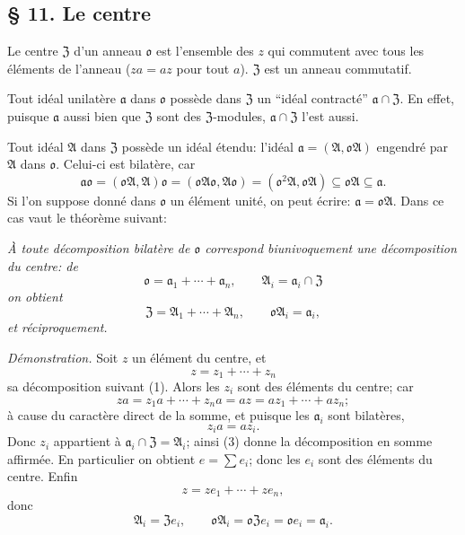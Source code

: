
\providecommand{\mo}{\mathfrak{o}}
\providecommand{\ma}{\mathfrak{a}}
\providecommand{\mA}{\mathfrak{A}}
\providecommand{\mZ}{\mathfrak{Z}}

\subsection*{\S{} 11. Le centre}

Le centre $\mZ$ d'un anneau $\mo$ est l'ensemble des $z$ qui commutent avec tous les éléments de l'anneau ($za=az$ pour tout $a$). $\mZ$ est un anneau commutatif.

Tout idéal unilatère $\ma$ dans $\mo$ possède dans $\mZ$ un ``idéal contracté'' $\ma\cap\mZ$. En effet, puisque $\ma$ aussi bien que $\mZ$ sont des $\mZ$-modules, $\ma\cap\mZ$ l'est aussi.

Tout idéal $\mA$ dans $\mZ$ possède un idéal étendu: l'idéal $\ma=(\mA,\mo\mA)$ engendré par $\mA$ dans $\mo$. Celui-ci est bilatère, car
\[
        \ma\mo=(\mo\mA,\mA)\mo=(\mo\mA\mo,\mA\mo)
        = (\mo^2\mA,\mo\mA)\subseteq \mo\mA\subseteq\ma.
\]
Si l'on suppose donné dans $\mo$ un élément unité, on peut écrire: $\ma=\mo\mA$. Dans ce cas vaut le théorème suivant:

\emph{À toute décomposition bilatère de $\mo$ correspond biunivoquement une décomposition du centre: de}
\begin{equation}
        \mo=\ma_1+\cdots+\ma_n,
        \qquad \mA_i=\ma_i\cap\mZ                         \tag{1}
\end{equation}
\emph{on obtient}
\begin{equation}
        \mZ=\mA_1+\cdots+\mA_n,
        \qquad \mo\mA_i=\ma_i,                              \tag{2}
\end{equation}
\emph{et réciproquement.}

\emph{Démonstration.} Soit $z$ un élément du centre, et
\begin{equation}
        z=z_1+\cdots+z_n                                    \tag{3}
\end{equation}
sa décomposition suivant (1). Alors les $z_i$ sont des éléments du centre; car
\[
        za=z_1a+\cdots+z_na=az=az_1+\cdots+az_n;
\]
à cause du caractère direct de la somme, et puisque les $\ma_i$ sont bilatères,
\[
        z_i a=az_i.
\]
Donc $z_i$ appartient à $\ma_i\cap\mZ=\mA_i$; ainsi (3) donne la décomposition en somme affirmée. En particulier on obtient $e=\sum e_i$; donc les $e_i$ sont des éléments du centre. Enfin
\[
        z=ze_1+\cdots+ze_n,
\]
donc
\[
        \mA_i=\mZ e_i,
        \qquad
        \mo\mA_i=\mo\mZ e_i=\mo e_i=\ma_i.
\]

